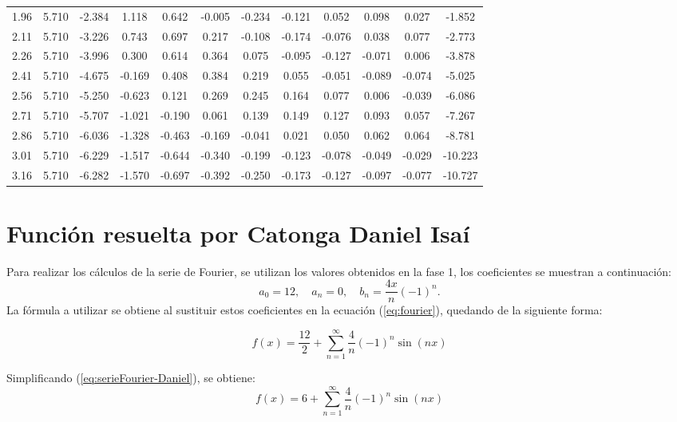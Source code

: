 {\begin{table}[H]
\begin{center}
{\begin{tabular}{|c|cccccccccc|c|}
1.96 & 5.710 & -2.384 & 1.118 & 0.642 & -0.005 & -0.234 & -0.121 & 0.052 & 0.098 & 0.027 & -1.852 \\
2.11 & 5.710 & -3.226 & 0.743 & 0.697 & 0.217 & -0.108 & -0.174 & -0.076 & 0.038 & 0.077 & -2.773 \\
2.26 & 5.710 & -3.996 & 0.300 & 0.614 & 0.364 & 0.075 & -0.095 & -0.127 & -0.071 & 0.006 & -3.878 \\
2.41 & 5.710 & -4.675 & -0.169 & 0.408 & 0.384 & 0.219 & 0.055 & -0.051 & -0.089 & -0.074 & -5.025 \\
2.56 & 5.710 & -5.250 & -0.623 & 0.121 & 0.269 & 0.245 & 0.164 & 0.077 & 0.006 & -0.039 & -6.086 \\
2.71 & 5.710 & -5.707 & -1.021 & -0.190 & 0.061 & 0.139 & 0.149 & 0.127 & 0.093 & 0.057 & -7.267 \\
2.86 & 5.710 & -6.036 & -1.328 & -0.463 & -0.169 & -0.041 & 0.021 & 0.050 & 0.062 & 0.064 & -8.781 \\
3.01 & 5.710 & -6.229 & -1.517 & -0.644 & -0.340 & -0.199 & -0.123 & -0.078 & -0.049 & -0.029 & -10.223 \\
3.16 & 5.710 & -6.282 & -1.570 & -0.697 & -0.392 & -0.250 & -0.173 & -0.127 & -0.097 & -0.077 & -10.727 \\
\hline
\end{tabular}
}
\end{center}
\end{table}








\section{Función resuelta por Catonga Daniel Isaí}
\label{sec:class-options}

Para realizar los cálculos de la serie de Fourier, se utilizan los valores obtenidos en la fase 1, los coeficientes se muestran a continuación:
\[
a_0 = 12, \quad a_n = 0, \quad b_n = \frac{4x}{n}(-1)^n.
\]
La fórmula a utilizar se obtiene al sustituir estos coeficientes en la ecuación (\ref{eq:fourier}), quedando de la siguiente forma:

\begin{equation}
\label{eq:serieFourier-Daniel}
f(x) = \frac{12}{2} + \sum_{n=1}^{\infty} \frac{4}{n}(-1)^n \sin(nx)
\end{equation}

Simplificando (\ref{eq:serieFourier-Daniel}), se obtiene:
\begin{equation}
\label{eq:serieFourier-Daniel-simplified}
f(x) = 6 + \sum_{n=1}^{\infty} \frac{4}{n}(-1)^n \sin(nx)
\end{equation}

}
